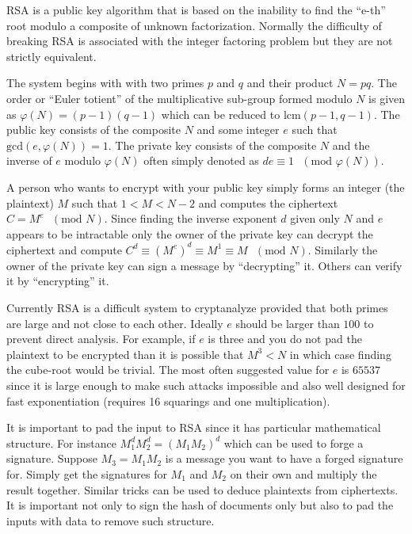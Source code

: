 \documentclass[a4paper]{book}
\def\phi{\varphi}
\begin{document}
RSA is a public key algorithm that is based on the inability to find the ``e-th'' root modulo a composite of unknown 
factorization.  Normally the difficulty of breaking RSA is associated with the integer factoring problem but they are
not strictly equivalent.

The system begins with with two primes $p$ and $q$ and their product $N = pq$.  The order or ``Euler totient'' of the
multiplicative sub-group formed modulo $N$ is given as $\phi(N) = (p - 1)(q - 1)$ which can be reduced to 
$\mbox{lcm}(p - 1, q - 1)$.  The public key consists of the composite $N$ and some integer $e$ such that 
$\mbox{gcd}(e, \phi(N)) = 1$.  The private key consists of the composite $N$ and the inverse of $e$ modulo $\phi(N)$ 
often simply denoted as $de \equiv 1\mbox{ }(\mbox{mod }\phi(N))$.

A person who wants to encrypt with your public key simply forms an integer (the plaintext) $M$ such that 
$1 < M < N-2$ and computes the ciphertext $C = M^e\mbox{ }(\mbox{mod }N)$.  Since finding the inverse exponent $d$
given only $N$ and $e$ appears to be intractable only the owner of the private key can decrypt the ciphertext and compute
$C^d \equiv \left (M^e \right)^d \equiv M^1 \equiv M\mbox{ }(\mbox{mod }N)$.  Similarly the owner of the private key 
can sign a message by ``decrypting'' it.  Others can verify it by ``encrypting'' it.  

Currently RSA is a difficult system to cryptanalyze provided that both primes are large and not close to each other.  
Ideally $e$ should be larger than $100$ to prevent direct analysis.  For example, if $e$ is three and you do not pad
the plaintext to be encrypted than it is possible that $M^3 < N$ in which case finding the cube-root would be trivial.  
The most often suggested value for $e$ is $65537$ since it is large enough to make such attacks impossible and also well 
designed for fast exponentiation (requires 16 squarings and one multiplication).

It is important to pad the input to RSA since it has particular mathematical structure.  For instance  
$M_1^dM_2^d = (M_1M_2)^d$ which can be used to forge a signature.  Suppose $M_3 = M_1M_2$ is a message you want
to have a forged signature for.  Simply get the signatures for $M_1$ and $M_2$ on their own and multiply the result
together.  Similar tricks can be used to deduce plaintexts from ciphertexts.  It is important not only to sign 
the hash of documents only but also to pad the inputs with data to remove such structure.  
\end{document}
